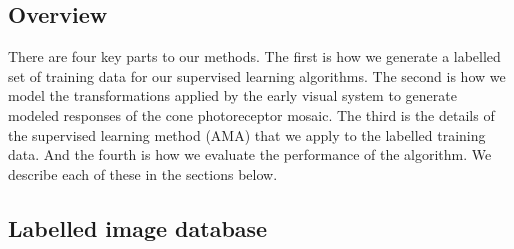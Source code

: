 \documentclass{jov}
\begin{document}
\subsection{Overview}
There are four key parts to our methods.  The first is how we generate a labelled set of training data for our supervised learning algorithms.  The second is how we model the transformations applied by the early visual system to generate modeled responses of the cone photoreceptor mosaic.  The third is the details of the supervised learning method (AMA) that we apply to the labelled training data.  And the fourth is how we evaluate the performance of the algorithm.  We describe each of these in the sections below.

\subsection{Labelled image database} \label{method:VirtualWorld}
\end{document}
